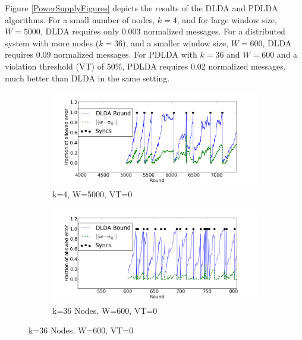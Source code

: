Figure \ref{PowerSupplyFigures} depicts the results of the DLDA
and PDLDA algorithms. For a small number of nodes, $k=4$, and for large
window size, $W=5000$, DLDA requires only 0.003 normalized messages.
For a distributed system with more nodes ($k=36$), and a smaller window
size, $W=600$, DLDA requires 0.09 normalized messages. For PDLDA with
$k=36$ and $W=600$ and a violation threshold (VT) of 50\%, PDLDA
requires 0.02 normalized messages, much better than DLDA in the same setting.
%
%
\begin{figure}
    \centering
    \begin{subfigure}[b]{0.5\textwidth}
        \includegraphics[width=\textwidth]{graphics/4nodes.png}
        \caption{k=4, W=5000, VT=0}
    \end{subfigure}

    \begin{subfigure}[b]{0.5\textwidth}
        \includegraphics[width=\textwidth]{graphics/36nodes.png}
        \caption{k=36 Nodes, W=600, VT=0}
    \end{subfigure}


\end{figure}

